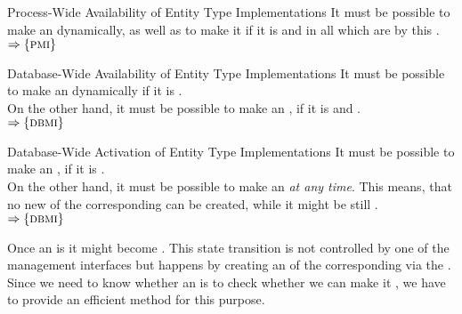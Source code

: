 \documentclass[a4paper, 12pt]{book}
\newcommand{\INTERFACE}[1]{$\Rightarrow\left\{#1\right\}$}
\begin{document}
\begin{requirement*}{Process-Wide Availability of Entity Type Implementations}
  It must be possible to make an   dynamically, as well as to
  make it  if it is  and  in all  which are
     by this .\\
  \INTERFACE{\PMI}
\end{requirement*}
%
\begin{requirement*}{Database-Wide Availability of Entity Type Implementations}
  It must be possible to make an   dynamically if it is .\\ On the other hand, it must
  be possible to make an  , if it is  and .\\
  \INTERFACE{\DBMI}
\end{requirement*}
\begin{requirement*}{Database-Wide Activation of Entity Type Implementations}
  It must be possible to make an  , if it is .\\
  On the other hand, it must be possible to make an   \emph{at any
    time}. This means, that no new  of the corresponding  can be created, while it might be still .\\
  \INTERFACE{\DBMI}
\end{requirement*}

Once an  is  it might become . This
state transition is not controlled by one of the management interfaces but
happens by creating an  of the corresponding 
via the \DBAI.\\
%
Since we need to know whether an  is  to check whether we can make it ,
we have to provide an efficient method for this purpose. 
\end{document}
